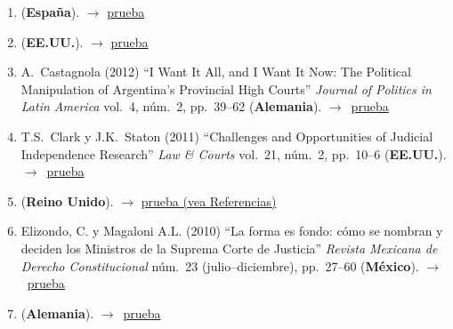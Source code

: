 \documentclass[12 pt, letter]{article}
\newenvironment{CitasMiTrabajo}{
    \begin{footnotesize}
    \begin{enumerate}[label={\footnotesize\emph{cita~\arabic*}},ref=\arabic*] %
        \setlength{\itemsep}{.1\itemsep}
        \setlength{\parskip}{.1\parskip}
    }{\end{enumerate}\end{footnotesize}}
\begin{document}
        \begin{CitasMiTrabajo}

        \item {} (\textbf{Espa\~na}). $\rightarrow$ \href{http://dx.doi.org/10.18042/cepc/aijc.20.03}{prueba}
          
        \item {} (\textbf{EE.UU.}). $\rightarrow$ \href{https://github.com/emagar/cv/blob/master/citasMiTrab/sanchMagalMagarChapter/carroll.tiedeVotingTribChile2012jhr.pdf}{prueba}

        \item A.~Castagnola (2012) ``I Want It All, and I Want It Now: The Political Manipulation of Argentina's Provincial High Courts'' \emph{Journal of Politics in Latin America} vol.~4, n\'um.~2, pp.~39--62 (\textbf{Alemania}). $\rightarrow$~\href{https://github.com/emagar/cv/blob/master/citasMiTrab/sanchMagalMagarChapter/castagnolaArgProvCourts2012jpla.pdf}{prueba}

        \item T.S.~Clark y J.K.~Staton  (2011) ``Challenges and Opportunities of Judicial Independence Research'' \emph{Law \& Courts} vol.~21, n\'um.~2, pp.~10--6 (\textbf{EE.UU.}). $\rightarrow$~\href{https://github.com/emagar/cv/blob/master/citasMiTrab/sanchMagalMagarChapter/clark.staton2011.pdf}{prueba}

        \item {} (\textbf{Reino Unido}). $\rightarrow$ \href{https://www.cambridge.org/core/journals/asian-journal-of-law-and-society/article/measuring-judicial-ideal-points-in-new-democracies-the-case-of-the-philippines/8E51C7D52349D1B554D2F2C33D347EC9}{prueba (vea Referencias)}

        \item Elizondo, C. y Magaloni A.L. (2010) ``La forma es fondo: c\'omo se nombran y deciden los Ministros de la Suprema Corte de Justicia'' \emph{Revista Mexicana de Derecho Constitucional} n\'um.~23 (julio--diciembre), pp.~27--60 (\textbf{M\'exico}). $\rightarrow$~\href{https://github.com/emagar/cv/blob/master/citasMiTrab/sanchMagalMagarChapter/MAGALONIELIZONDO2010cc23.pdf}{prueba}

          \item {} (\textbf{Alemania}). $\rightarrow$~\href{https://www.researchgate.net/profile/Laarni_Escresa/publication/263970563_Judicial_Politics_in_Unstable_Democracies_The_Case_of_the_Philippine_Supreme_Court_An_Empirical_Analysis_1986-2010/links/55b3ca4b08ae092e9653b175/Judicial-Politics-in-Unstable-Democracies-The-Case-of-the-Philippine-Supreme-Court-An-Empirical-Analysis-1986-2010.pdf}{prueba}
          

\end{CitasMiTrabajo}
\end{document}
